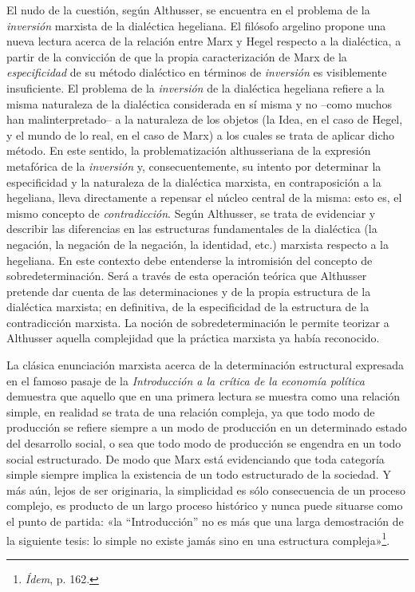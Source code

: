 El nudo de la cuestión, según Althusser, se encuentra en el problema de la \emph{inversión} marxista de la dialéctica hegeliana. El filósofo argelino propone una nueva lectura acerca de la relación entre Marx y Hegel respecto a la dialéctica, a partir de la convicción de que la propia caracterización de Marx de la \emph{especificidad} de su método dialéctico en términos de \emph{inversión} es visiblemente insuficiente. El problema de la \emph{inversión} de la dialéctica hegeliana refiere a la misma naturaleza de la dialéctica considerada en sí misma y no --como muchos han malinterpretado-- a la naturaleza de los objetos (la Idea, en el caso de Hegel, y el mundo de lo real, en el caso de Marx) a los cuales se trata de aplicar dicho método. En este sentido, la problematización althusseriana de la expresión metafórica de la \emph{inversión} y, consecuentemente, su intento por determinar la especificidad y la naturaleza de la dialéctica marxista, en contraposición a la hegeliana, lleva directamente a repensar el núcleo central de la misma: esto es, el mismo concepto de \emph{contradicción}. Según Althusser, se trata de evidenciar y describir las diferencias en las estructuras fundamentales de la dialéctica (la negación, la negación de la negación, la identidad, etc.) marxista respecto a la hegeliana. En este contexto debe entenderse la intromisión del concepto de sobredeterminación. Será a través de esta operación teórica que Althusser pretende dar cuenta de las determinaciones y de la propia estructura de la dialéctica marxista; en definitiva, de la especificidad de la estructura de la contradicción marxista. La noción de sobredeterminación le permite teorizar a Althusser aquella complejidad que la práctica marxista ya había reconocido.

La clásica enunciación marxista acerca de la determinación estructural expresada en el famoso pasaje de la \emph{Introducción a la crítica de la economía política} demuestra que aquello que en una primera lectura se muestra como una relación simple, en realidad se trata de una relación compleja, ya que todo modo de producción se refiere siempre a un modo de producción en un determinado estado del desarrollo social, o sea que todo modo de producción se engendra en un todo social estructurado. De modo que Marx está evidenciando que toda categoría simple siempre implica la existencia de un todo estructurado de la sociedad. Y más aún, lejos de ser originaria, la simplicidad es sólo consecuencia de un proceso complejo, es producto de un largo proceso histórico y nunca puede situarse como el punto de partida: «la ``Introducción'' no es más que una larga demostración de la siguiente tesis: lo simple no existe jamás sino en una estructura compleja»\footnote{\emph{Ídem}, p. 162.}.

